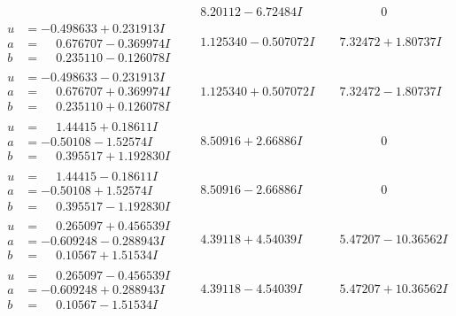 \documentclass[1p]{elsarticle_modified}
\theoremstyle{definition}
\begin{document}
$$\begin{array}{c|c|c}
 & \phantom{-}8.20112 - 6.72484 I & \phantom{-0.000000 } 0 \\ \hline\begin{aligned}
u &= -0.498633 + 0.231913 I \\
a &= \phantom{-}0.676707 - 0.369974 I \\
b &= \phantom{-}0.235110 - 0.126078 I\end{aligned}
 & \phantom{-}1.125340 - 0.507072 I & \phantom{-}7.32472 + 1.80737 I \\ \hline\begin{aligned}
u &= -0.498633 - 0.231913 I \\
a &= \phantom{-}0.676707 + 0.369974 I \\
b &= \phantom{-}0.235110 + 0.126078 I\end{aligned}
 & \phantom{-}1.125340 + 0.507072 I & \phantom{-}7.32472 - 1.80737 I \\ \hline\begin{aligned}
u &= \phantom{-}1.44415 + 0.18611 I \\
a &= -0.50108 - 1.52574 I \\
b &= \phantom{-}0.395517 + 1.192830 I\end{aligned}
 & \phantom{-}8.50916 + 2.66886 I & \phantom{-0.000000 } 0 \\ \hline\begin{aligned}
u &= \phantom{-}1.44415 - 0.18611 I \\
a &= -0.50108 + 1.52574 I \\
b &= \phantom{-}0.395517 - 1.192830 I\end{aligned}
 & \phantom{-}8.50916 - 2.66886 I & \phantom{-0.000000 } 0 \\ \hline\begin{aligned}
u &= \phantom{-}0.265097 + 0.456539 I \\
a &= -0.609248 - 0.288943 I \\
b &= \phantom{-}0.10567 + 1.51534 I\end{aligned}
 & \phantom{-}4.39118 + 4.54039 I & \phantom{-}5.47207 - 10.36562 I \\ \hline\begin{aligned}
u &= \phantom{-}0.265097 - 0.456539 I \\
a &= -0.609248 + 0.288943 I \\
b &= \phantom{-}0.10567 - 1.51534 I\end{aligned}
 & \phantom{-}4.39118 - 4.54039 I & \phantom{-}5.47207 + 10.36562 I \\ \hline\begin{aligned}

\end{aligned}
\end{array}$$
\end{document}
